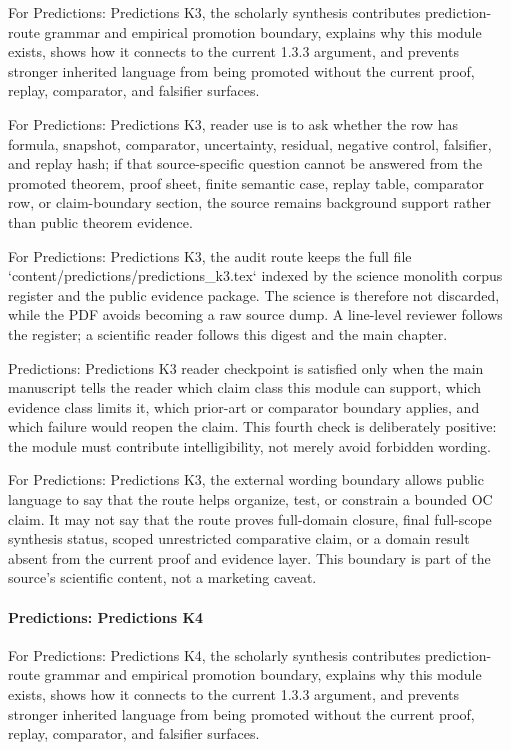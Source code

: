 For Predictions: Predictions K3, the scholarly synthesis contributes prediction-route grammar and empirical promotion boundary, explains why this module exists, shows how it connects to the current 1.3.3 argument, and prevents stronger inherited language from being promoted without the current proof, replay, comparator, and falsifier surfaces.


For Predictions: Predictions K3, reader use is to ask whether the row has formula, snapshot, comparator, uncertainty, residual, negative control, falsifier, and replay hash; if that source-specific question cannot be answered from the promoted theorem, proof sheet, finite semantic case, replay table, comparator row, or claim-boundary section, the source remains background support rather than public theorem evidence.


For Predictions: Predictions K3, the audit route keeps the full file `content/predictions/predictions\_k3.tex` indexed by the science monolith corpus register and the public evidence package. The science is therefore not discarded, while the PDF avoids becoming a raw source dump. A line-level reviewer follows the register; a scientific reader follows this digest and the main chapter.


Predictions: Predictions K3 reader checkpoint is satisfied only when the main manuscript tells the reader which claim class this module can support, which evidence class limits it, which prior-art or comparator boundary applies, and which failure would reopen the claim. This fourth check is deliberately positive: the module must contribute intelligibility, not merely avoid forbidden wording.


For Predictions: Predictions K3, the external wording boundary allows public language to say that the route helps organize, test, or constrain a bounded OC claim. It may not say that the route proves full-domain closure, final full-scope synthesis status, scoped unrestricted comparative claim, or a domain result absent from the current proof and evidence layer. This boundary is part of the source's scientific content, not a marketing caveat.


\paragraph{Predictions: Predictions K4}

For Predictions: Predictions K4, the scholarly synthesis contributes prediction-route grammar and empirical promotion boundary, explains why this module exists, shows how it connects to the current 1.3.3 argument, and prevents stronger inherited language from being promoted without the current proof, replay, comparator, and falsifier surfaces.


